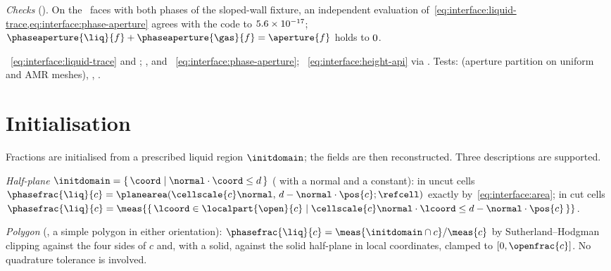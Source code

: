 \emph{Checks} (). On the \chkPhaseFaces\ faces with
both phases of the sloped-wall fixture, an independent evaluation
of~\cref{eq:interface:liquid-trace,eq:interface:phase-aperture} agrees with the
code to $5.6\times10^{-17}$; $\phaseaperture{\liq}{f}+\phaseaperture{\gas}{f}=\aperture{f}$
holds to $0$.

\begin{implnote}
~\cref{eq:interface:liquid-trace}
and ;
,
and ~\cref{eq:interface:phase-aperture};
~\cref{eq:interface:height-api} via
. Tests:
(aperture partition on uniform and AMR meshes),
,
.
\end{implnote}

\section{Initialisation}\label{sec:interface:init}
Fractions are initialised from a prescribed liquid region $\initdomain$; the
fields are then reconstructed. Three descriptions are supported.

\emph{Half-plane}
$\initdomain=\set{\coord}{\normal\cdot\coord\le d}$ (
with a normal and a constant): in uncut cells
$\phasefrac{\liq}{c}=\planearea(\cellscale{c}\normal,\,d-\normal\cdot\pos{c};\refcell)$
exactly by~\cref{eq:interface:area}; in cut cells
$\phasefrac{\liq}{c}=\meas{\set{\lcoord\in\localpart{\open}{c}}{\cellscale{c}\normal\cdot\lcoord\le d-\normal\cdot\pos{c}}}$.

\emph{Polygon} (, a simple polygon in either
orientation): $\phasefrac{\liq}{c}=\meas{\initdomain\cap c}/\meas{c}$ by
Sutherland--Hodgman clipping against the four sides of $c$ and, with a solid,
against the solid half-plane in local coordinates, clamped to
$[0,\openfrac{c}]$. No quadrature tolerance is involved.

